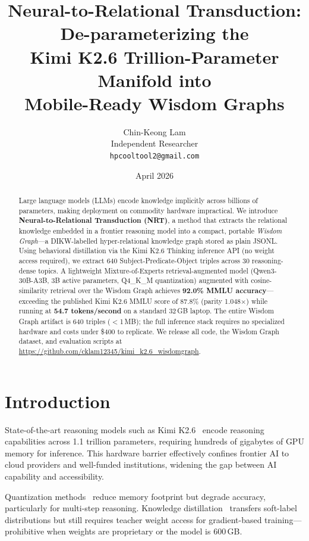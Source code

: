 \documentclass[11pt]{article}
\title{\textbf{Neural-to-Relational Transduction: De-parameterizing the\\
Kimi K2.6 Trillion-Parameter Manifold into\\
Mobile-Ready Wisdom Graphs}}
\author{
  Chin-Keong Lam\\
  Independent Researcher\\
  \texttt{hpcooltool2@gmail.com}
}
\date{April 2026}
\begin{document}
\maketitle

\begin{abstract}
\sloppy
Large language models (LLMs) encode knowledge implicitly across billions of
parameters, making deployment on commodity hardware impractical.
We introduce \textbf{Neural-to-Relational Transduction (NRT)}, a method that
extracts the relational knowledge embedded in a frontier reasoning model into a
compact, portable \emph{Wisdom Graph}---a DIKW-labelled hyper-relational
knowledge graph stored as plain JSONL.
Using behavioral distillation via the Kimi K2.6 Thinking inference API
(no weight access required), we extract 640 Subject-Predicate-Object triples
across 30 reasoning-dense topics.
A lightweight Mixture-of-Experts retrieval-augmented model
(Qwen3-30B-A3B, 3B active parameters, Q4\_K\_M quantization)
augmented with cosine-similarity retrieval over the Wisdom Graph
achieves \textbf{92.0\% MMLU accuracy}---exceeding the published Kimi K2.6
MMLU score of 87.8\% (parity 1.048$\times$) while running at
\textbf{54.7 tokens/second} on a standard 32\,GB laptop.
The entire Wisdom Graph artifact is 640 triples ($<$1\,MB); the full
inference stack requires no specialized hardware and costs under \$400
to replicate.
We release all code, the Wisdom Graph dataset, and evaluation scripts
at \url{https://github.com/cklam12345/kimi_k2.6_wisdomgraph}.
\end{abstract}

\section{Introduction}
\label{sec:intro}

State-of-the-art reasoning models such as Kimi K2.6~\citep{kimi2026} encode
reasoning capabilities across 1.1 trillion parameters, requiring hundreds of
gigabytes of GPU memory for inference.
This hardware barrier effectively confines frontier AI to cloud providers and
well-funded institutions, widening the gap between AI capability and
accessibility.

Quantization methods~\citep{dettmers2022llmint8,frantar2022gptq} reduce
memory footprint but degrade accuracy, particularly for multi-step reasoning.
Knowledge distillation~\citep{hinton2015distilling} transfers soft-label
distributions but still requires teacher weight access for gradient-based
training---prohibitive when weights are proprietary or the model is
600\,GB.
\end{document}
